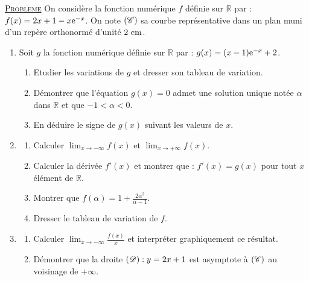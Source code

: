 \noindent \underline{\textsc{Probleme}} \newline
      On consid\`ere la fonction num\'erique $f$ d\'efinie sur $\mathbb{R}$ par : $f(x) = 2x + 1 - x \mathrm{e}^{-x}$.
      On note $(\mathscr{C})$ sa courbe repr\'esentative dans un plan muni d'un rep\`ere orthonorm\'e \Oij{} d'unit\'e $2~\mathrm{cm}$.
      \begin{enumerate}
            \item Soit $g$ la fonction num\'erique d\'efinie sur $\mathbb{R}$ par : $g(x) = (x-1) \mathrm{e}^{-x} + 2$.
                  \begin{enumerate}
                        \item Etudier les variations de $g$ et dresser son tableau de variation.
                        \item D\'emontrer que l'\'equation $g(x) = 0$ admet une solution unique not\'ee $\alpha$ 
                              dans $\mathbb{R}$ et que $-1 < \alpha < 0$.
                        \item En d\'eduire le signe de $g(x)$ suivant les valeurs de $x$.
                  \end{enumerate}
            \item \begin{enumerate}
                        \item Calculer $\lim_{x\rightarrow -\infty} f(x) $ et $\lim_{x\rightarrow +\infty} f(x)$.
                        \item Calculer la d\'eriv\'ee $f'(x)$ et montrer que : $f'(x) = g(x)$ pour tout $x$ \'el\'ement de 
                              $\mathbb{R}$.
                        \item Montrer que $f(\alpha ) = 1 + \frac{2 \alpha^2}{\alpha - 1}$.
                        \item Dresser le tableau de variation de $f$.
                  \end{enumerate}
            \item \begin{enumerate}
                        \item Calculer $\lim_{x\rightarrow -\infty} \frac{f(x)}{x}$ et interpr\'eter graphiquement ce r\'esultat.
                        \item D\'emontrer que la droite $(\mathscr{D}) : y = 2x + 1$ est asymptote \`a $(\mathscr{C})$ au voisinage de $+\infty$.

\end{enumerate}
\end{enumerate}
